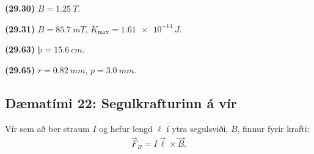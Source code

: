 \ifdefined \wholebook \else\documentclass[oneside]{book}\usepackage{EdlBook}\graphicspath{{figures/}}
\begin{document}
\begin{tcolorbox}
\begin{enumerate*}[label = ]
  \item \textbf{(29.30)} $B = \SI{1.25}{T}$.
  \item \textbf{(29.31)} $B = \SI{85.7}{mT}$, $K_{\text{max}} = \SI{1.61e-14}{J}$.
  \item \textbf{(29.63)} $þ = \SI{15.6}{cm}$. \\
  \item \textbf{(29.65)} $r = \SI{0.82}{mm}$, $p = \SI{3.0}{mm}$.
\end{enumerate*}
\end{tcolorbox}


\newpage 

\subsection*{Dæmatími 22: Segulkrafturinn á vír}

\begin{tcolorbox}
Vír sem að ber straum $I$ og hefur lengd $\ell$ í ytra segulsviði, $B$, finnur fyrir krafti:
\begin{align*}
    \vec{F}_B = I \vec{\ell} \times \vec{B}.
\end{align*}
\end{tcolorbox}
\end{document}
